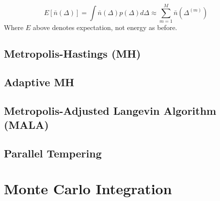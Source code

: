 \documentclass[twoside]{article}
\begin{document}
$$  E[\bar n(\Delta)] = \int \bar n(\Delta) p(\Delta) d\Delta \approx \sum_{m=1}^M  \bar n (\Delta^{(m)}) $$
Where $E$ above denotes expectation, not energy as before.

\subsection{Metropolis-Hastings (MH)}

\subsection{Adaptive MH}

\subsection{Metropolis-Adjusted Langevin Algorithm (MALA) }

\subsection{Parallel Tempering}

\section{Monte Carlo Integration}

  

\end{document}
